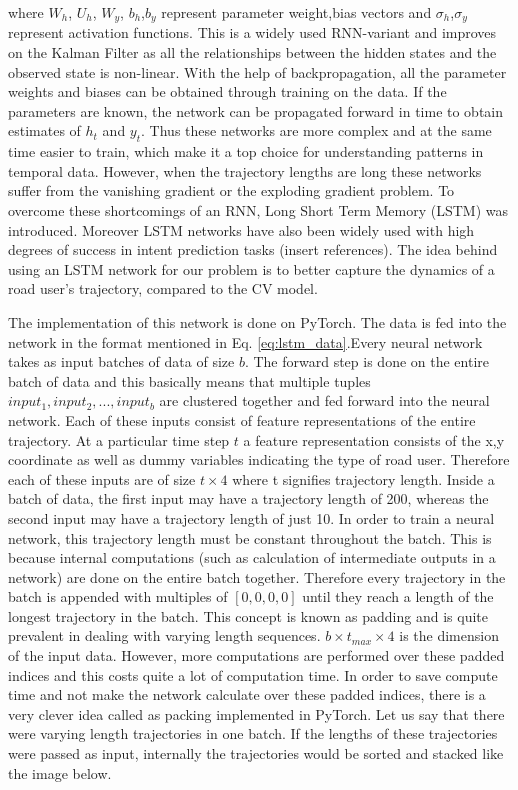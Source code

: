 \documentclass{article}
\begin{document}
where $W_h$, $U_h$, $W_y$, $b_h$,$b_y$ represent parameter weight,bias vectors and $\sigma_h$,$\sigma_y$ represent activation functions. This is a widely used RNN-variant and improves on the Kalman Filter as all the relationships between the hidden states and the observed state is non-linear. With the help of backpropagation, all the parameter weights and biases can be obtained through training on the data. If the parameters are known, the network can be propagated forward in time to obtain estimates of $h_t$ and $y_t$. Thus these networks are more complex and at the same time easier to train, which make it a top choice for understanding patterns in temporal data. However, when the trajectory lengths are long these networks suffer from the vanishing gradient or the exploding gradient problem.  To overcome these shortcomings of an RNN, Long Short Term Memory (LSTM) was introduced. Moreover LSTM networks have also been widely used with high degrees of success in intent prediction tasks (insert references). The idea behind using an LSTM network for our problem is to better capture the dynamics of a road user's trajectory, compared to the CV model. 

The implementation of this network is done on PyTorch. The data is fed into the network in the format mentioned in Eq. \ref{eq:lstm_data}.Every neural network takes as input batches of data of size $b$. The forward step is done on the entire batch of data and this basically means that multiple tuples $input_1,input_2,...,input_b$ are clustered together and fed forward into the neural network. Each of these inputs consist of feature representations of the entire trajectory. At a particular time step $t$ a feature representation consists of the x,y coordinate as well as dummy variables indicating the type of road user. Therefore each of these inputs are of size $t \times 4$ where t signifies trajectory length. Inside a batch of data, the first input may have a trajectory length of 200, whereas the second input may have a trajectory length  of just 10. In order to train a neural network, this trajectory length must be constant throughout the batch. This is because internal computations (such as calculation of intermediate outputs in a network) are done on the entire batch together. Therefore every trajectory in the batch is appended with multiples of $[0,0,0,0]$ until they reach a length of the longest trajectory in the batch. This concept is known as padding and is quite prevalent in dealing with varying length sequences. $b\times t_{max} \times 4$ is the dimension of the input data.   However, more computations are performed over these padded indices and this costs quite a lot of computation time. In order to save compute time and not make the network calculate over these padded indices, there is a very clever idea called as packing implemented in PyTorch. Let us say that there were varying length trajectories in one batch. If the lengths of these trajectories were passed as input, internally the trajectories would be sorted and stacked like the image below. 
\end{document}
